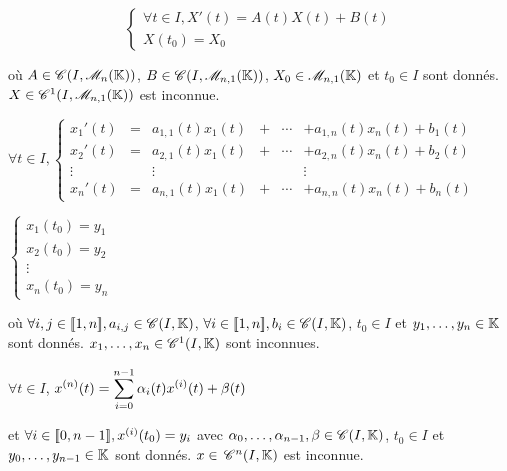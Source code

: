 
\svspace $$\begin{cases}
    \forall t \in I, X'(t) = A(t) X(t) + B(t) \\
    X(t_0) = X_0
\end{cases}$$

où $A \in \mathscr C(I, \mathscr M_n(\mathbb{K}))$, $B \in \mathscr C(I, \mathscr M_{n,1}(\mathbb{K}))$,
$X_0 \in \mathscr M_{n,1}(\mathbb{K})$ et $t_0 \in I$ sont donnés. $X \in \mathscr C^1(I, \mathscr M_{n,1}(\mathbb{K}))$ est inconnue.


\svspace $\forall t \in I, \left\{ \begin{array}{lccccc}
    x_1'(t) & = & a_{1,1}(t)x_1(t) & + & \cdots & + a_{1,n}(t)x_n(t) + b_1(t) \\
    x_2'(t) & = & a_{2,1}(t)x_1(t) & + & \cdots & + a_{2,n}(t)x_n(t) + b_2(t) \\
    \vdots & & \vdots & & & \vdots \\
    x_n'(t) & = & a_{n,1}(t)x_1(t) & + & \cdots & + a_{n,n}(t)x_n(t) + b_n(t)
\end{array} \right.$

$\begin{cases}
    x_1(t_0) = y_1 \\
    x_2(t_0) = y_2 \\
    \vdots \\
    x_n(t_0) = y_n
\end{cases}$

où $\forall i, j \in [\![1, n]\!], a_{i,j} \in \mathscr C(I, \mathbb{K})$, $\forall i \in [\![1, n]\!], b_i \in \mathscr C(I, \mathbb{K})$,
$t_0 \in I$ et $y_1, \dots, y_n \in \mathbb{K}$ sont donnés. $x_1, \dots, x_n \in \mathscr C^1(I, \mathbb{K})$ sont inconnues.


\svspace $\forall t \in I$, 
$\displaystyle x^{(n)}(t) = \sum_{i = 0}^{n - 1} \alpha_i(t) x^{(i)}(t) + \beta(t)$

et $\forall i \in [\![0, n - 1]\!], x^{(i)}(t_0) = y_i$ avec 
$\alpha_0, \dots, \alpha_{n-1}, \beta \in \mathscr C(I, \mathbb{K})$, $t_0 \in I$ et $y_0, \dots, y_{n-1} \in \mathbb{K}$ sont donnés. $x \in \,\mathscr C^{n} (I, \mathbb{K})$ est inconnue.

